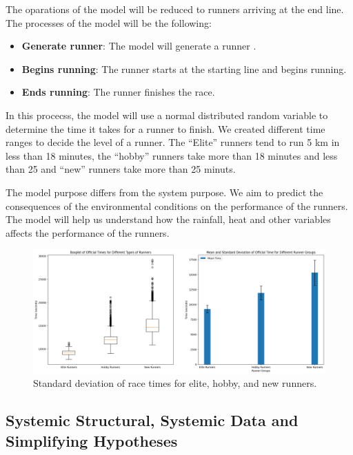 \documentclass[conference]{IEEEtran}
\begin{document}
The oparations of the model will be reduced to runners arriving at the end line. The processes of the model will be the following:
\begin{itemize}
    \item \textbf{Generate runner}: The model will generate a runner .
    \item \textbf{Begins running}: The runner starts at the starting line and begins running.
    \item \textbf{Ends running}: The runner finishes the race.
\end{itemize}

In this procecss, the model will use a normal distributed random variable to determine the time it takes for a runner to finish. We created different time ranges to decide the level of a runner. The ``Elite'' runners tend to run 5 km in less than 18 minutes, the ``hobby'' runners take more than 18 minutes and less than 25 and ``new'' runners take more than 25 minuts.

The model purpose differs from the system purpose. We aim to predict the consequences of the environmental conditions on the performance of the runners. The model will help us understand how the rainfall, heat and other variables affects the performance of the runners.
\begin{figure}[htbp]
\centerline{\includegraphics[width=\linewidth]{figs/elite_hobby_new_standar_deviation.png}}
\caption{Standard deviation of race times for elite, hobby, and new runners.}
\label{fig:elite_hobby_new_standar_deviation}
\end{figure}


\subsection{Systemic Structural, Systemic Data and Simplifying Hypotheses}
\end{document}

